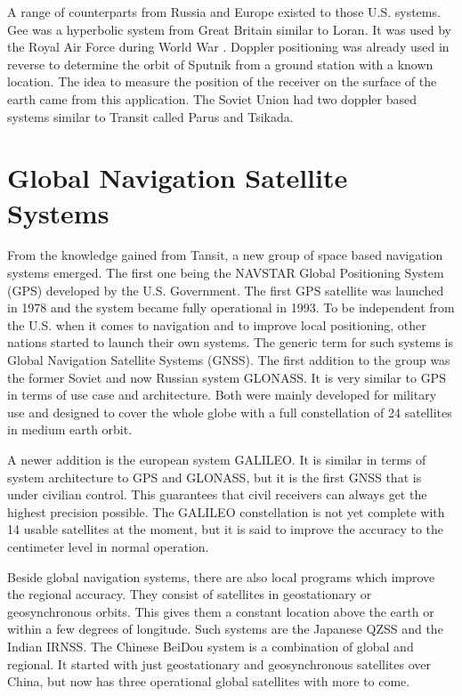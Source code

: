 A range of counterparts from Russia and Europe existed to those U.S. systems.
Gee was a hyperbolic system from Great Britain similar to Loran.
It was used by the Royal Air Force during World War .
Doppler positioning was already used in reverse to determine the orbit of Sputnik  from a ground station with a known location.
The idea to measure the position of the receiver on the surface of the earth came from this application.
The Soviet Union had two doppler based systems similar to Transit called Parus and Tsikada. \cite{misra2011global}


\section{Global Navigation Satellite Systems}

From the knowledge gained from Tansit, a new group of space based navigation systems emerged. 
The first one being the NAVSTAR Global Positioning System (GPS) developed by the U.S. Government.
The first GPS satellite was launched in 1978 and the system became fully operational in 1993.
To be independent from the U.S. when it comes to navigation and to improve local positioning, other nations started to launch their own systems.
The generic term for such systems is Global Navigation Satellite Systems (GNSS).
The first addition to the group was the former Soviet and now Russian system GLONASS.
It is very similar to GPS in terms of use case and architecture.
Both were mainly developed for military use and designed to cover the whole globe with a full constellation of 24 satellites in medium earth orbit. \cite{misra2011global}

A newer addition is the european system GALILEO.
It is similar in terms of system architecture to GPS and GLONASS, but it is the first GNSS that is under civilian control.
This guarantees that civil receivers can always get the highest precision possible.
The GALILEO constellation is not yet complete with 14 usable satellites at the moment, but it is said to improve the accuracy to the centimeter level in normal operation. \cite{GSA_Galileo}

Beside global navigation systems, there are also local programs which improve the regional accuracy.
They consist of satellites in geostationary or geosynchronous orbits.
This gives them a constant location above the earth or within a few degrees of longitude.
Such systems are the Japanese QZSS and the Indian IRNSS.
The Chinese BeiDou system is a combination of global and regional.
It started with just geostationary and geosynchronous satellites over China, but now has three operational global satellites with more to come. \cite{GLONASS}


